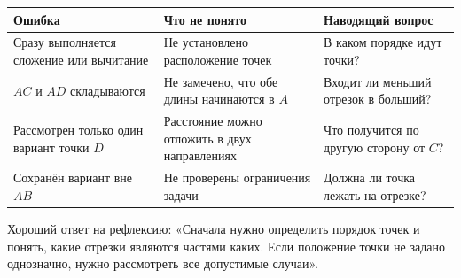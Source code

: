 \begin{center}
  \renewcommand{\arraystretch}{1.42}
  \begin{tabularx}{\textwidth}{
    >{\raggedright\arraybackslash}p{}
    >{\raggedright\arraybackslash}p{}
    >{\raggedright\arraybackslash}X}
    \toprule
    \rowcolor{TableHeader}
    Ошибка & Что не понято & Наводящий вопрос \\
    \midrule
    Сразу выполняется сложение или вычитание
      & Не установлено расположение точек
      & В каком порядке идут точки? \\
    \addlinespace[0.2em]
    \(AC\) и \(AD\) складываются
      & Не замечено, что обе длины начинаются в \(A\)
      & Входит ли меньший отрезок в больший? \\
    \addlinespace[0.2em]
    Рассмотрен только один вариант точки \(D\)
      & Расстояние можно отложить в двух направлениях
      & Что получится по другую сторону от \(C\)? \\
    \addlinespace[0.2em]
    Сохранён вариант вне \(AB\)
      & Не проверены ограничения задачи
      & Должна ли точка лежать на отрезке? \\
    \bottomrule
  \end{tabularx}
\end{center}

\begin{teacherbox}
  Хороший ответ на рефлексию: «Сначала нужно определить порядок точек и
  понять, какие отрезки являются частями каких. Если положение точки не
  задано однозначно, нужно рассмотреть все допустимые случаи».
\end{teacherbox}
